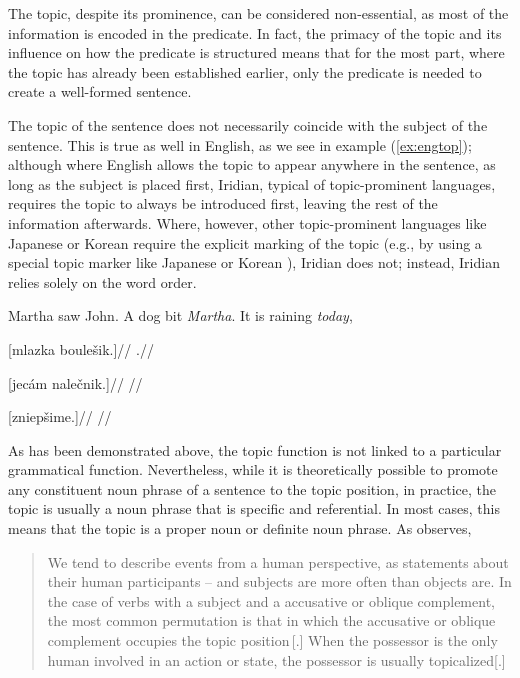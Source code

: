 The topic, despite its prominence, can be considered non-essential, as most of
the information is encoded in the predicate. In fact, the primacy of the topic
and its influence on how the predicate is structured means that for the most
part, where the topic has already been established earlier, only the predicate
is needed to create a well-formed sentence. 

The topic of the sentence does not necessarily coincide with the subject of the
sentence. This is true as well in English, as we see in example
(\ref{ex:engtop}); although where English allows the topic to appear anywhere in
the sentence, as long as the subject is placed first, Iridian, typical of
topic-prominent languages, requires the topic to always be introduced first,
leaving the rest of the information afterwards. Where, however, other
topic-prominent languages like Japanese or Korean require the explicit marking
of the topic (e.g., by using a special topic marker like Japanese  or
Korean ), Iridian does not; instead, Iridian relies solely on the
word order.

\pex\label{ex:engtop}
\a Martha saw John.
\a A dog bit \emph{Martha}.
\a It is raining \emph{today},
\xe

\pex
\a
\begingl
\gla \relax[Janek] [mlazka boulešik.]//
\glft {}.//
\endgl

\a
\begingl
\gla \relax[Tereza] [jecám nalečnik.]//
\glft {}//
\endgl

\a
\begingl
\gla \relax[Shléd] [zniepšime.]//
\glft {}//
\endgl
\xe

As has been demonstrated above, the topic function is not linked to a particular
grammatical function. Nevertheless, while it is theoretically possible to
promote any constituent noun phrase of a sentence to the topic position, in
practice, the topic is usually a noun phrase that is specific and referential.
In most cases, this means that the topic is a proper noun or definite noun
phrase. As \textcite{kiss2004} observes,
\begin{quote}
  We tend to describe events from a human perspective, as statements about their
  human participants – and subjects are more often {\sc[+human]} than objects
  are. In the case of verbs with a {\sc[–human]} subject and a {\sc[+human]}
  accusative or oblique complement,  the  most  common  permutation  is  that
  in  which  the  accusative  or oblique complement occupies the topic
  position\,[.] When the possessor is the only human involved in an action or
  state, the possessor is usually topicalized[.]
\end{quote}


